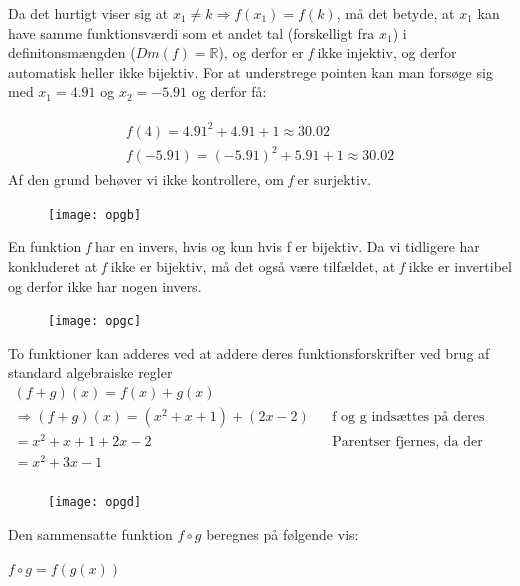 \documentclass{article}
\begin{document}
Da det hurtigt viser sig at $x_1 \neq k \Rightarrow f(x_1) = f(k)$, må det betyde, at $x_1$ kan have samme funktionsværdi som et andet tal (forskelligt fra $x_1$) i definitonsmængden ($Dm(f) = \mathbb{R}$), og derfor er \emph{f} ikke injektiv, og derfor automatisk heller ikke bijektiv. For at understrege pointen kan man forsøge sig med $x_1 = 4.91$ og $x_2 = -5.91$ og derfor få:

\begin{align*}
\begin{split}
f(4) = 4.91^2 + 4.91 + 1 \approx 30.02  \\
f(-5.91) = (-5.91)^2 + 5.91 + 1 \approx 30.02
\end{split}
\end{align*}
Af den grund behøver vi ikke kontrollere, om \emph{f} er surjektiv.


\begin{figure}[h]
\texttt{[image: opgb]}
\end{figure}

En funktion \emph{f} har en invers, hvis og kun hvis f er bijektiv. Da vi tidligere har konkluderet at \emph{f} ikke er bijektiv, må det også være tilfældet, at \emph{f} ikke er invertibel og derfor ikke har nogen invers.

\begin{figure}[h]
\texttt{[image: opgc]}
\end{figure}
To funktioner kan adderes ved at addere deres funktionsforskrifter ved brug af standard algebraiske regler
\begin{align*}
(f+g)(x) = f(x) + g(x) \\
\Rightarrow (f+g)(x) = (x^2 + x + 1) + (2x - 2) && \text{f og g indsættes på deres pladser} \\
= x^2 + x + 1 + 2x - 2 && \text{Parentser fjernes, da der kun indgår + mellem dem} \\
= x^2 + 3x - 1 \\
\end{align*}

\begin{figure}[h]
\texttt{[image: opgd]}
\end{figure}
Den sammensatte funktion $f \circ g$ beregnes på følgende vis:
\par
\begin{center}
\begin{math}
f \circ g = f(g(x))
\end{math}
\end{center}
\end{document}
